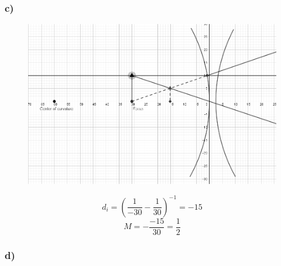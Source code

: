 \documentclass[../homework.tex]{subfiles}
\begin{document}
\subsubsection*{c)}
\begin{figure}[H]
    \centering
    \includegraphics[width=\columnwidth]{p1-c.png}
\end{figure}
\begin{equation*}
    d_i = \left(\frac{1}{-30} - \frac{1}{30}\right)^{-1} = -15
\end{equation*}
\begin{equation*}
    M = -\frac{-15}{30} = \frac{1}{2}
\end{equation*}

\subsubsection*{d)}
\end{document}
